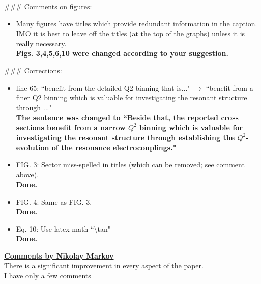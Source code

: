 \documentclass[,superscriptaddress,showpacs,amssymb,amsmath,amsfonts,linenumbers,article]{revtex4-1}
\begin{document}
\#\#\# Comments on figures:\\[0.5cm]

\begin{itemize}

\item Many figures have titles which provide redundant information in the caption. IMO it is best to leave
off the titles (at the top of the graphs) unless it is really necessary.\\[0.5cm]
{\bf Figs. 3,4,5,6,10 were changed according to your suggestion.}


\end{itemize}

\#\#\# Corrections:\\[0.5cm]

\begin{itemize}

\item line 65: ``benefit from the detailed Q2 binning that is..." $\rightarrow$ ``benefit from a finer Q2 binning which is
valuable for investigating the resonant structure through ..."\\
{\bf The sentence was changed to ``Beside that, the reported cross sections benefit from a narrow $Q^{2}$ binning which is valuable for investigating the resonant structure  through establishing the $Q^{2}$-evolution of the resonance electrocouplings."}


\item  FIG. 3: Sector miss-spelled in titles (which can be removed; see comment above).\\
{\bf Done.}

\item  FIG. 4: Same as FIG. 3.\\
{\bf Done.}


\item  Eq. 10: Use latex math ``\textbackslash tan" \\[0.5cm]
{\bf Done.}

\end{itemize}



\vspace{1cm}
\underline{\bf Comments by Nikolay Markov}\\[1cm]

There is a significant improvement in every aspect of the paper.\\

I have only a few comments\\[0.5cm]
\end{document}
